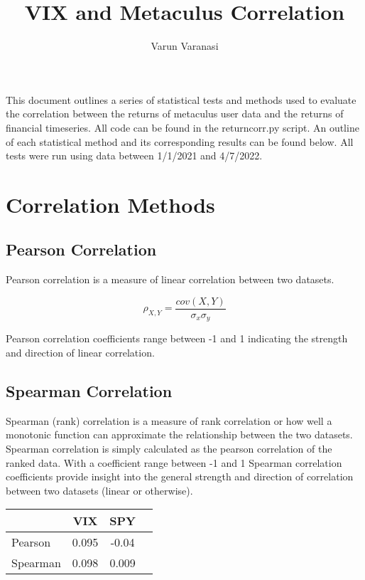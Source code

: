\documentclass{article}
\title{VIX and Metaculus Correlation}
\author{Varun Varanasi}
\begin{document}
\maketitle

This document outlines a series of statistical tests and methods used to evaluate the correlation between the returns of metaculus user data and the returns of financial timeseries.
All code can be found in the return\textunderscore corr.py script. An outline of each statistical method and its corresponding results can be found below. All tests were run using data between 1/1/2021 and 4/7/2022.

\section*{Correlation Methods}
\subsection*{Pearson Correlation}
Pearson correlation is a measure of linear correlation between two datasets. 

$$
\rho_{X,Y} = \frac{cov(X,Y)}{\sigma_x \sigma_y}
$$

Pearson correlation coefficients range between -1 and 1 indicating the strength and direction of linear correlation.


\subsection*{Spearman Correlation}

Spearman (rank) correlation is a measure of rank correlation or how well a monotonic function can approximate the relationship between the two datasets. Spearman correlation is simply calculated as the pearson correlation of the ranked data. With a coefficient range between -1 and 1 Spearman correlation coefficients provide insight into the general strength and direction of correlation between two datasets (linear or otherwise).

\begin{table}[h]
    \centering
\begin{tabular}{l||ccc}
    \toprule
     & \textbf{VIX} & \textbf{SPY} & \\
    \midrule
    Pearson & 0.095 & -0.04 \\
    Spearman & 0.098 & 0.009\\
    \bottomrule
\end{tabular}
\end{table}
\end{document}
